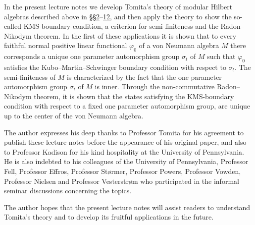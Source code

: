\documentclass[12pt,b5paper,twoside]{article}
\theoremstyle{takesaki}
\numberwithin{equation}{section}
\begin{document}
In the present lecture notes we develop Tomita's theory of modular
Hilbert algebras described above in \hyperref[sec:2]{\S\S2}--\hyperref[sec:12]{12}, and then apply the theory
to show the so-called KMS-boundary condition, a criterion for
semi-finiteness and the Radon--Nikodym theorem.  In the first of these
applications it is shown that to every faithful normal positive linear
functional $\varphi _0$ of a von Neumann algebra $M$ there corresponds a
unique one parameter automorphism group $\sigma_t$ of $M$ such that
$\varphi _0$ satisfies the Kubo--Martin--Schwinger boundary condition
with respect to $\sigma_t$.  The semi-finiteness of $M$ is characterized
by the fact that the one parameter automorphism group $\sigma_t$ of $M$
is inner.  Through the non-commutative Radon--Nikodym theorem, it is shown
that the states satisfying the KMS-boundary condition with respect to a
fixed one parameter automorphism group, are unique up to the center of
the von Neumann algebra.

The author expresses his deep thanks to Professor Tomita for his
agreement to publish these lecture notes before the appearance of his
original paper, and also to Professor Kadison for his kind hospitality
at the University of Pennsylvania.  He is also indebted to his
colleagues of the University of Pennsylvania, Professor Fell, Professor
Effros, Professor St{\o}rmer, Professor Powers, Professor Vowden,
Professor Nielsen and Professor Vesterstr{\o}m who participated in the
informal seminar discussions concerning the topics.

The author hopes that the present lecture notes will assist readers to
understand Tomita's theory and to develop its fruitful applications in
the future.
\end{document}
